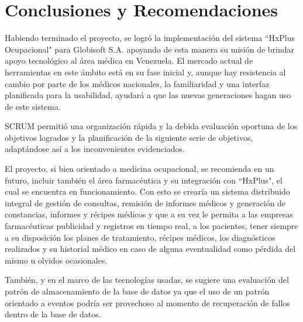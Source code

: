 \chapter{Conclusiones y Recomendaciones}

    Habiendo terminado el proyecto, se logró la implementación del sistema ``HxPlus Ocupacional" para Globisoft S.A. apoyando de esta manera su misión de brindar apoyo tecnológico al área médica en Venezuela. El mercado actual de herramientas en este ámbito está en su fase inicial y, aunque hay resistencia al cambio por parte de los médicos nacionales, la familiaridad y una interfaz planificada para la usabilidad, ayudará a que las nuevas generaciones hagan uso de este sistema.
    
    SCRUM permitió una organización rápida y la debida evaluación oportuna de los objetivos logrados y la planificación de la siguiente serie de objetivos, adaptándose así a los inconvenientes evidenciados.
    
    El proyecto, si bien orientado a medicina ocupacional, se recomienda en un futuro, incluir también el área farmacéutica y su integración con ``HxPlus", el cual se encuentra en funcionamiento. Con esto se crearía un sistema distribuido integral de gestión de consultas, remisión de informes médicos y generación de constancias, informes y récipes médicos y que a su vez le permita a las empresas farmacéuticas publicidad y registros en tiempo real, a los pacientes, tener siempre a su disposición los planes de tratamiento, récipes médicos, los diagnósticos realizados y su historial médico en caso de alguna eventualidad como pérdida del mismo u olvidos ocasionales.
    
    También, y en el marco de las tecnologías usadas, se sugiere una evaluación del patrón de almacenamiento de la base de datos ya que el uso de un patrón orientado a eventos podría ser provechoso al momento de recuperación de fallos dentro de la base de datos.


